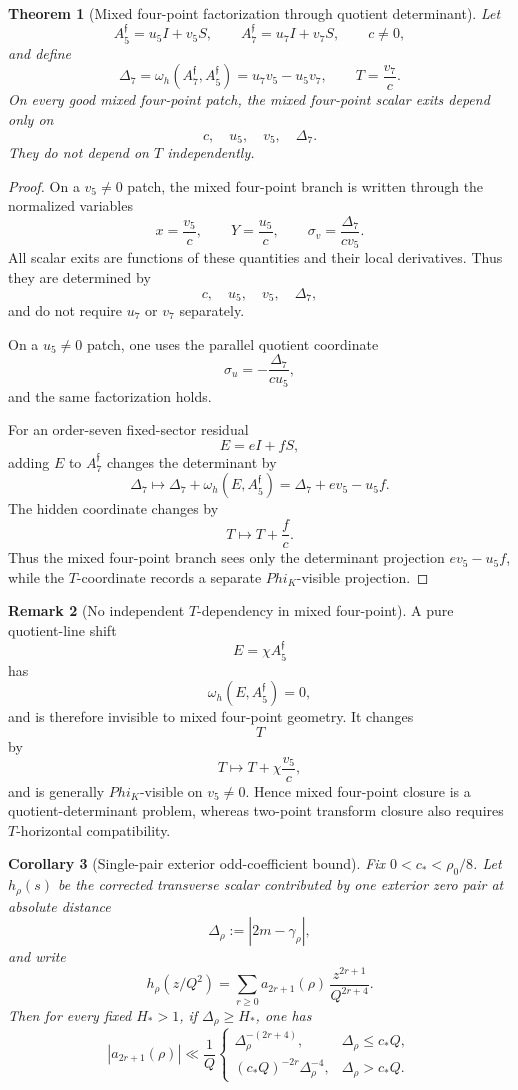 \documentclass[11pt,a4paper]{amsart}
\def\Phi{Phi}%
\theoremstyle{plain}
\newtheorem{theorem}{Theorem}[section]
\newtheorem{corollary}[theorem]{Corollary}
\theoremstyle{definition}
\newtheorem{remark}[theorem]{Remark}
\begin{document}
\begin{theorem}[Mixed four-point factorization through quotient determinant]
\label{thm:mixed-four-point-factors-through-delta-seven}
Let
\[
A_5^{\mathfrak f}=u_5I+v_5S,
\qquad
A_7^{\mathfrak f}=u_7I+v_7S,
\qquad
c\ne0,
\]
and define
\[
\Delta_7
=
\omega_h(A_7^{\mathfrak f},A_5^{\mathfrak f})
=
u_7v_5-u_5v_7,
\qquad
T=\frac{v_7}{c}.
\]
On every good mixed four-point patch, the mixed four-point scalar exits depend
only on
\[
c,\quad u_5,\quad v_5,\quad \Delta_7.
\]
They do not depend on \(T\) independently.
\end{theorem}

\begin{proof}
On a \(v_5\ne0\) patch, the mixed four-point branch is written through the
normalized variables
\[
x=\frac{v_5}{c},
\qquad
Y=\frac{u_5}{c},
\qquad
\sigma_v=\frac{\Delta_7}{cv_5}.
\]
All scalar exits are functions of these quantities and their local
derivatives.  Thus they are determined by
\[
c,\quad u_5,\quad v_5,\quad \Delta_7,
\]
and do not require \(u_7\) or \(v_7\) separately.

On a \(u_5\ne0\) patch, one uses the parallel quotient coordinate
\[
\sigma_u=-\frac{\Delta_7}{cu_5},
\]
and the same factorization holds.

For an order-seven fixed-sector residual
\[
E=eI+fS,
\]
adding \(E\) to \(A_7^{\mathfrak f}\) changes the determinant by
\[
\Delta_7\longmapsto
\Delta_7+\omega_h(E,A_5^{\mathfrak f})
=
\Delta_7+ev_5-u_5f.
\]
The hidden coordinate changes by
\[
T\longmapsto T+\frac{f}{c}.
\]
Thus the mixed four-point branch sees only the determinant projection
\(ev_5-u_5f\), while the \(T\)-coordinate records a separate
\(\Phi_K\)-visible projection.
\end{proof}

\begin{remark}[No independent \(T\)-dependency in mixed four-point]
\label{rem:no-t-dependency-mixed-four-point}
A pure quotient-line shift
\[
E=\chi A_5^{\mathfrak f}
\]
has
\[
\omega_h(E,A_5^{\mathfrak f})=0,
\]
and is therefore invisible to mixed four-point geometry.  It changes
\[
T
\]
by
\[
T\longmapsto T+\chi\frac{v_5}{c},
\]
and is generally \(\Phi_K\)-visible on \(v_5\ne0\).  Hence mixed four-point
closure is a quotient-determinant problem, whereas two-point transform closure
also requires \(T\)-horizontal compatibility.
\end{remark}

\begin{corollary}[Single-pair exterior odd-coefficient bound]
\label{cor:single-pair-odd-jet}
Fix $0<c_*<\rho_0/8$. Let $h_\rho(s)$ be the corrected transverse scalar
contributed by one exterior zero pair at absolute distance
\[
\Delta_\rho:=|2m-\gamma_\rho|,
\]
and write
\[
h_\rho(z/Q^2)
=
\sum_{r\ge 0} a_{2r+1}(\rho)\,\frac{z^{2r+1}}{Q^{2r+4}}.
\]
Then for every fixed $H_*>1$, if $\Delta_\rho\ge H_*$, one has
\[
\boxed{
|a_{2r+1}(\rho)|
\ll
\frac{1}{Q}
\begin{cases}
\Delta_\rho^{-(2r+4)}, & \Delta_\rho\le c_*Q,\\[1ex]
(c_*Q)^{-2r}\Delta_\rho^{-4}, & \Delta_\rho>c_*Q.
\end{cases}
}
\]
\end{corollary}
\end{document}
